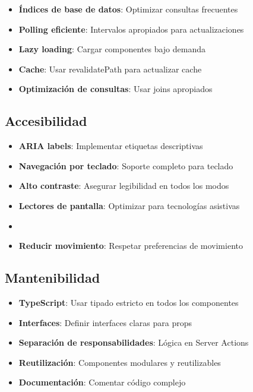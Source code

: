 \documentclass[12pt,a4paper]{article}
\begin{document}
\begin{itemize}
    \item \textbf{Índices de base de datos}: Optimizar consultas frecuentes
    \item \textbf{Polling eficiente}: Intervalos apropiados para actualizaciones
    \item \textbf{Lazy loading}: Cargar componentes bajo demanda
    \item \textbf{Cache}: Usar revalidatePath para actualizar cache
    \item \textbf{Optimización de consultas}: Usar joins apropiados
\end{itemize}

\subsection{Accesibilidad}

\begin{itemize}
    \item \textbf{ARIA labels}: Implementar etiquetas descriptivas
    \item \textbf{Navegación por teclado}: Soporte completo para teclado
    \item \textbf{Alto contraste}: Asegurar legibilidad en todos los modos
    \item \textbf{Lectores de pantalla}: Optimizar para tecnologías asistivas
    \item \item \textbf{Reducir movimiento}: Respetar preferencias de movimiento
\end{itemize}

\subsection{Mantenibilidad}

\begin{itemize}
    \item \textbf{TypeScript}: Usar tipado estricto en todos los componentes
    \item \textbf{Interfaces}: Definir interfaces claras para props
    \item \textbf{Separación de responsabilidades}: Lógica en Server Actions
    \item \textbf{Reutilización}: Componentes modulares y reutilizables
    \item \textbf{Documentación}: Comentar código complejo
\end{itemize}
\end{document}
